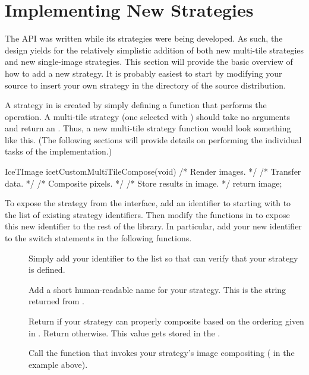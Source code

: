 \section{Implementing New Strategies}
\label{sec:Strategies:New}

The \IceT API was written while its strategies were being developed.  As
such, the design yields for the relatively simplistic addition of both new
multi-tile strategies and new single-image strategies.  This section will
provide the basic overview of how to add a new strategy.  It is probably
easiest to start by modifying your \IceT source to insert your own strategy
in the  directory of the \IceT source distribution.

A strategy in \IceT is created by simply defining a function that performs
the operation.  A multi-tile strategy (one selected with
) should take no arguments and return an
.  Thus, a new multi-tile strategy function would look
something like this.  (The following sections will provide details on
performing the individual tasks of the implementation.)

\begin{code}
IceTImage icetCustomMultiTileCompose(void)
{
    /* Render images. */
    /* Transfer data. */
    /* Composite pixels. */
    /* Store results in image. */
    return image;
}
\end{code}

To expose the strategy from the \IceT interface, add an identifier to
 starting with  to the list of
existing strategy identifiers.  Then modify the functions in
 to expose this new identifier to the rest
of the \IceT library.  In particular, add your new identifier to the switch
statements in the following functions.

\begin{description}
\item[] Simply add your identifier to the list so
  that \IceT can verify that your strategy is defined.
\item[] Add a short human-readable name for
  your strategy.  This is the string returned from
  .
\item[] Return  if your
  strategy can properly composite based on the ordering given in
  .  Return  otherwise.
  This value gets stored in the
  .
\item[] Call the function that invokes your
  strategy's image compositing ( in the
  example above).
\end{description}

